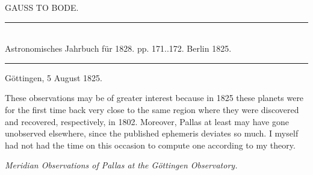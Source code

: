 \clearpage
{}

\begin{center}
{\large GAUSS TO BODE.}
\end{center}

\begin{center}
\rule{6cm}{0.4pt}\\
Astronomisches Jahrbuch für 1828. pp. 171..172. Berlin 1825.\\
\rule{6cm}{0.4pt}
\end{center}

\begin{flushright}
Göttingen, 5 August 1825.
\end{flushright}

These observations may be of greater interest because in 1825 these planets were for the first time back very close to the same region where they were discovered and recovered, respectively, in 1802. Moreover, Pallas at least may have gone unobserved elsewhere, since the published ephemeris deviates so much. I myself had not had the time on this occasion to compute one according to my theory.

\begin{center}
\emph{Meridian Observations of Pallas at the Göttingen Observatory.}
\end{center}


